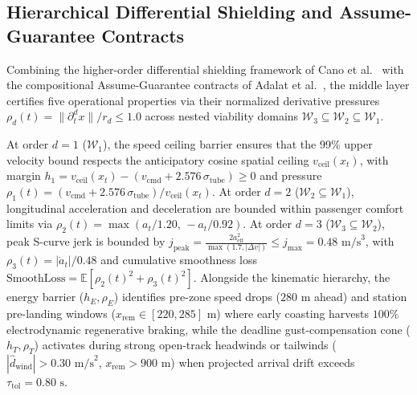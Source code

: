 \documentclass[10pt,a4paper]{article}
\begin{document}
\subsection{Hierarchical Differential Shielding and Assume-Guarantee Contracts}

Combining the higher-order differential shielding framework of Cano et al.\ \cite{cano2026} with the compositional Assume-Guarantee contracts of Adalat et al.\ \cite{adalat2026a,adalat2026b}, the middle layer certifies five operational properties via their normalized derivative pressures $\rho_d(t) = \|\partial_t^d x\| / r_d \le 1.0$ across nested viability domains $\mathcal{W}_3 \subseteq \mathcal{W}_2 \subseteq \mathcal{W}_1$.

At order $d=1$ ($\mathcal{W}_1$), the speed ceiling barrier ensures that the 99\% upper velocity bound respects the anticipatory cosine spatial ceiling $v_{\text{ceil}}(x_t)$, with margin $h_1 = v_{\text{ceil}}(x_t) - (v_{\text{cmd}} + 2.576\,\sigma_{\text{tube}}) \ge 0$ and pressure $\rho_1(t) = (v_{\text{cmd}} + 2.576\,\sigma_{\text{tube}}) / v_{\text{ceil}}(x_t)$. At order $d=2$ ($\mathcal{W}_2 \subseteq \mathcal{W}_1$), longitudinal acceleration and deceleration are bounded within passenger comfort limits via $\rho_2(t) = \max(a_t / 1.20,\, -a_t / 0.92)$. At order $d=3$ ($\mathcal{W}_3 \subseteq \mathcal{W}_2$), peak S-curve jerk is bounded by $j_{\text{peak}} = \frac{2 a_{\text{eff}}^2}{\max(1.7, |\Delta v|)} \le j_{\max} = 0.48\text{ m/s}^3$, with $\rho_3(t) = |\dot{a}_t| / 0.48$ and cumulative smoothness loss $\text{SmoothLoss} = \mathbb{E}[\rho_2(t)^2 + \rho_3(t)^2]$. Alongside the kinematic hierarchy, the energy barrier ($h_E, \rho_E$) identifies pre-zone speed drops ($280\text{ m}$ ahead) and station pre-landing windows ($x_{\text{rem}} \in [220, 285]\text{ m}$) where early coasting harvests $100\%$ electrodynamic regenerative braking, while the deadline gust-compensation cone ($h_T, \rho_T$) activates during strong open-track headwinds or tailwinds ($|\hat{d}_{\text{wind}}| > 0.30\text{ m/s}^2$, $x_{\text{rem}} > 900\text{ m}$) when projected arrival drift exceeds $\tau_{\text{tol}} = 0.80\text{ s}$.
\end{document}
